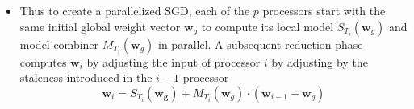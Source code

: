 \begin{itemize}
    \item Thus to create a parallelized SGD, each of the $p$ processors start with the same initial global weight vector $\bm{w}_{g}$ to compute its local model $S_{T_i} \left( \bm{w}_{g} \right)$ and model combiner $M_{T_{i}} \left( \bm{w}_{g} \right)$ in parallel. A subsequent reduction phase computes $\bm{w}_{i}$ by adjusting the input of processor $i$ by adjusting by the staleness introduced in the $i-1$ processor
    \[
        \bm{w}_{i} = S_{T_{i}} \left( \bm{w_{g}} \right) + M_{T_{i}} \left( \bm{w}_{g} \right) \cdot \left( \bm{w}_{i-1} - \bm{w}_{g} \right)
    \]
\end{itemize}